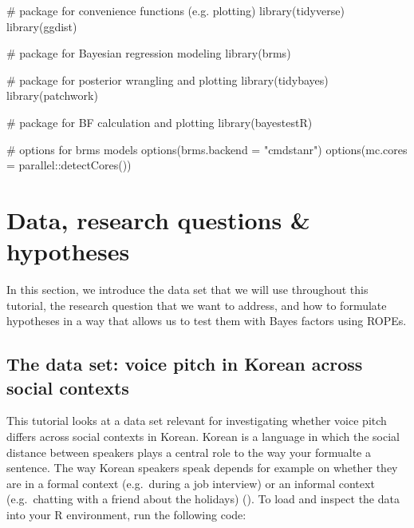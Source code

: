 \documentclass[
  doc,
  floatsintext,
  longtable,
  nolmodern,
  notxfonts,
  notimes,
  colorlinks=true,linkcolor=blue,citecolor=blue,urlcolor=blue]{apa7}
\newenvironment{Shaded}{\begin{snugshade}}{\end{snugshade}}
\newcommand{\AttributeTok}[1]{\textcolor[rgb]{0.40,0.45,0.13}{#1}}
\newcommand{\CommentTok}[1]{\textcolor[rgb]{0.37,0.37,0.37}{#1}}
\newcommand{\FunctionTok}[1]{\textcolor[rgb]{0.28,0.35,0.67}{#1}}
\newcommand{\NormalTok}[1]{\textcolor[rgb]{0.00,0.23,0.31}{#1}}
\newcommand{\SpecialCharTok}[1]{\textcolor[rgb]{0.37,0.37,0.37}{#1}}
\newcommand{\StringTok}[1]{\textcolor[rgb]{0.13,0.47,0.30}{#1}}
\begin{document}
\begin{Shaded}
\begin{Highlighting}[]
\CommentTok{\# package for convenience functions (e.g. plotting)}
\FunctionTok{library}\NormalTok{(tidyverse)}
\FunctionTok{library}\NormalTok{(ggdist)}

\CommentTok{\# package for Bayesian regression modeling}
\FunctionTok{library}\NormalTok{(brms)}

\CommentTok{\# package for posterior wrangling and plotting}
\FunctionTok{library}\NormalTok{(tidybayes)}
\FunctionTok{library}\NormalTok{(patchwork)}

\CommentTok{\# package for BF calculation and plotting}
\FunctionTok{library}\NormalTok{(bayestestR)}

\CommentTok{\# options for brms models }
\FunctionTok{options}\NormalTok{(}\AttributeTok{brms.backend =} \StringTok{"cmdstanr"}\NormalTok{)}
\FunctionTok{options}\NormalTok{(}\AttributeTok{mc.cores =}\NormalTok{ parallel}\SpecialCharTok{::}\FunctionTok{detectCores}\NormalTok{())}
\end{Highlighting}
\end{Shaded}

\section{Data, research questions \&
hypotheses}\label{data-research-questions-hypotheses}

In this section, we introduce the data set that we will use throughout
this tutorial, the research question that we want to address, and how to
formulate hypotheses in a way that allows us to test them with Bayes
factors using ROPEs.

\subsection{The data set: voice pitch in Korean across social
contexts}\label{the-data-set-voice-pitch-in-korean-across-social-contexts}

This tutorial looks at a data set relevant for investigating whether
voice pitch diﬀers across social contexts in Korean. Korean is a
language in which the social distance between speakers plays a central
role to the way your formualte a sentence. The way Korean speakers speak
depends for example on whether they are in a formal context (e.g.~during
a job interview) or an informal context (e.g.~chatting with a friend
about the holidays)
(). To load and inspect the data into your R environment,
run the following code:
\end{document}
